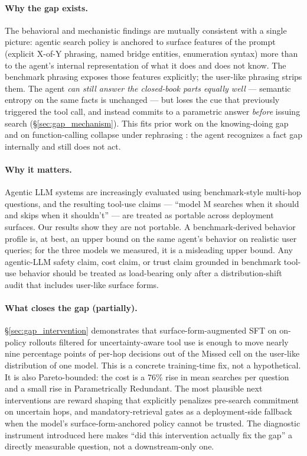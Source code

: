 \documentclass[10pt,letterpaper]{article}
\begin{document}
\paragraph{Why the gap exists.}
The behavioral and mechanistic findings are mutually consistent with a single
picture: agentic search policy is anchored to surface features of the prompt
(explicit X-of-Y phrasing, named bridge entities, enumeration syntax) more than to
the agent's internal representation of what it does and does not know. The
benchmark phrasing exposes those features explicitly; the user-like phrasing
strips them. The agent \emph{can still answer the closed-book parts equally well}
--- semantic entropy on the same facts is unchanged --- but loses the cue that
previously triggered the tool call, and instead commits to a parametric answer
\emph{before} issuing search (\S\ref{sec:gap_mechanism}). This fits prior work on
the knowing-doing gap \citep{knowingdoing2026} and on function-calling collapse
under rephrasing \citep{rabinovich2025agentic}: the agent recognizes a fact gap
internally and still does not act.

\paragraph{Why it matters.}
Agentic LLM systems are increasingly evaluated using benchmark-style multi-hop
questions, and the resulting tool-use claims --- ``model M searches when it
should and skips when it shouldn't'' --- are treated as portable across
deployment surfaces. Our results show they are not portable. A benchmark-derived
behavior profile is, at best, an upper bound on the same agent's behavior on
realistic user queries; for the three models we measured, it is a misleading
upper bound. Any agentic-LLM safety claim, cost claim, or trust claim grounded
in benchmark tool-use behavior should be treated as load-bearing only after a
distribution-shift audit that includes user-like surface forms.

\paragraph{What closes the gap (partially).}
\S\ref{sec:gap_intervention} demonstrates that surface-form-augmented SFT on
on-policy rollouts filtered for uncertainty-aware tool use is enough to move
nearly nine percentage points of per-hop decisions out of the Missed cell on the
user-like distribution of one model. This is a concrete training-time fix, not a
hypothetical. It is also Pareto-bounded: the cost is a 76\% rise in mean searches
per question and a small rise in Parametrically Redundant. The most plausible
next interventions are reward shaping that explicitly penalizes pre-search
commitment on uncertain hops, and mandatory-retrieval gates as a deployment-side
fallback when the model's surface-form-anchored policy cannot be trusted. The
diagnostic instrument introduced here makes ``did this intervention actually fix
the gap'' a directly measurable question, not a downstream-only one.
\end{document}
